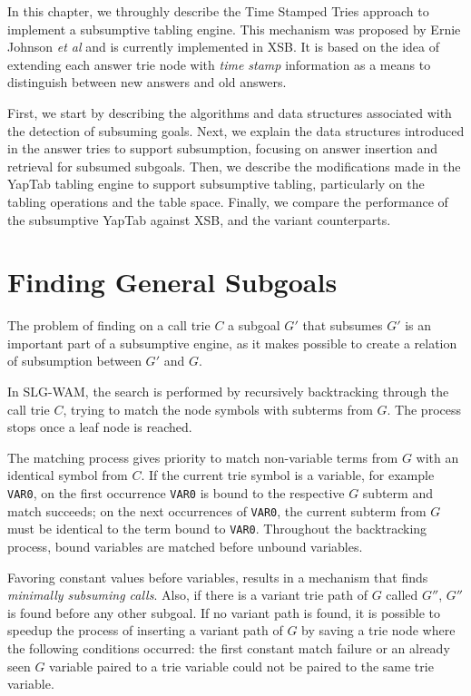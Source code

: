 In this chapter, we throughly describe the Time Stamped Tries approach
to implement a subsumptive tabling engine. This mechanism was proposed by
Ernie Johnson \textit{et al} \cite{Johnson-99} and is currently implemented in XSB.
It is based on the idea of extending each answer trie node with \textit{time stamp}
information as a means to distinguish between new answers and old answers.

First, we start by describing the algorithms and data structures associated
with the detection of subsuming goals. Next, we explain the data structures
introduced in the answer tries to support subsumption, focusing on answer insertion
and retrieval for subsumed subgoals. Then, we describe the modifications made in the YapTab
tabling engine to support subsumptive tabling, particularly on the tabling operations and the table space.
Finally, we compare the performance of
the subsumptive YapTab against XSB, and the variant counterparts.

\section{Finding General Subgoals}\label{sec:lookup_subsuming}

The problem of finding on a call trie $C$ a subgoal $G'$ that subsumes $G'$ 
is an important part of a subsumptive engine, as it makes possible to create
a relation of subsumption between $G'$ and $G$.  

In SLG-WAM, the search is performed by recursively backtracking through the call trie $C$, trying
to match the node symbols with subterms from $G$. The process stops once a leaf node is reached.

The matching process gives priority to match non-variable terms from $G$
with an identical symbol from $C$.
If the current trie symbol is a variable, for example \texttt{VAR0}, on the first occurrence \texttt{VAR0}
is bound to the respective $G$ subterm
and match succeeds; on the next occurrences of \texttt{VAR0}, the current subterm from $G$ must
be identical to the term bound to \texttt{VAR0}. Throughout the backtracking process, bound variables are
matched before unbound variables.

Favoring constant values before variables, results in a mechanism that finds \textit{minimally subsuming calls}.
Also, if there is a variant trie path of $G$ called $G''$, $G''$ is found before any other subgoal.
If no variant path is found, it is possible to speedup the process of inserting a variant path of $G$
by saving a trie node where the following conditions occurred: the first constant match failure or an already seen
$G$ variable paired to a trie variable could not be paired to the same trie variable.

